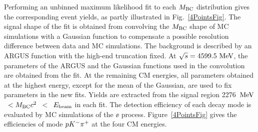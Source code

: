 \documentclass[twocolumn,showpacs,superscriptaddress,amsmath,amssymb]{revtex4-1}
\begin{document}
Performing an unbinned maximum likelihood fit to each $M_{\textrm{BC}}$ distribution gives the corresponding event yields, as partly illustrated in Fig.~\ref{4PointsFig}. The signal shape of the fit is obtained from convolving the $M_{\textrm{BC}}$ shape of MC simulations with a Gaussian function to compensate a possible resolution difference between data and MC simulations. The background is described by an ARGUS function with the high-end truncation fixed. At $\sqrt{s}=4599.5~\mathrm{MeV}$, the parameters of the ARGUS and the Gaussian functions used in the convolution are obtained from the fit. At the remaining CM energies, all parameters obtained at the highest energy, except for the mean of the Gaussian, are used to fix parameters in the new fits. Yields are extracted from the signal region 2276~$\mathrm{MeV}$~$<M_{\textrm{BC}} c^{2}$~$<$~$E_{\textrm{beam}}$ in each fit. The detection efficiency of each decay mode is evaluated by MC simulations of the $\ee$ process. Figure~\ref{4PointsFig} gives the efficiencies of mode $pK^{-}\pi^{+}$ at the four CM energies.
\end{document}

